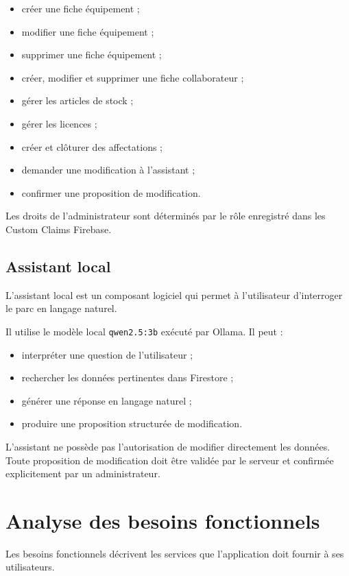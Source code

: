 \documentclass{rapportENSIAS}
\begin{document}
\begin{itemize}
\item créer une fiche équipement ;
\item modifier une fiche équipement ;
\item supprimer une fiche équipement ;
\item créer, modifier et supprimer une fiche collaborateur ;
\item gérer les articles de stock ;
\item gérer les licences ;
\item créer et clôturer des affectations ;
\item demander une modification à l’assistant ;
\item confirmer une proposition de modification.
\end{itemize}

Les droits de l’administrateur sont déterminés par le rôle enregistré dans les Custom Claims Firebase.

\subsection{Assistant local}

L’assistant local est un composant logiciel qui permet à l’utilisateur d’interroger le parc en langage naturel.

Il utilise le modèle local \texttt{qwen2.5:3b} exécuté par Ollama. Il peut :

\begin{itemize}
\item interpréter une question de l’utilisateur ;
\item rechercher les données pertinentes dans Firestore ;
\item générer une réponse en langage naturel ;
\item produire une proposition structurée de modification.
\end{itemize}

L’assistant ne possède pas l’autorisation de modifier directement les données. Toute proposition de modification doit être validée par le serveur et confirmée explicitement par un administrateur.

\section{Analyse des besoins fonctionnels}

Les besoins fonctionnels décrivent les services que l’application doit fournir à ses utilisateurs.
\end{document}
